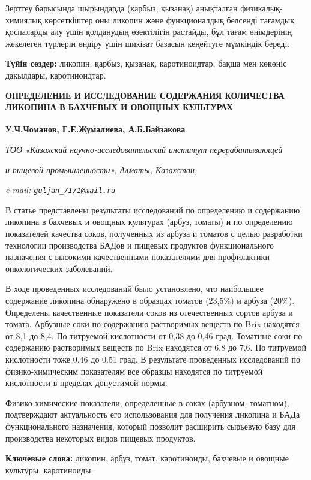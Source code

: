 Зерттеу барысында шырындарда (қарбыз, қызанақ) анықталған
физикалық-химиялық көрсеткіштер оны ликопин және функционалдық белсенді
тағамдық қоспаларды алу үшін қолданудың өзектілігін растайды, бұл тағам
өнімдерінің жекелеген түрлерін өндіру үшін шикізат базасын кеңейтуге
мүмкіндік береді.

{\bfseries Түйін сөздер:} ликопин, қарбыз, қызанақ, каротиноидтар, бақша
мен көкөніс дақылдары, каротиноидтар.

{\bfseries ОПРЕДЕЛЕНИЕ И ИССЛЕДОВАНИЕ СОДЕРЖАНИЯ КОЛИЧЕСТВА ЛИКОПИНА В
БАХЧЕВЫХ И ОВОЩНЫХ КУЛЬТУРАХ}

{\bfseries У.Ч.Чоманов, Г.Е.Жумалиева\textsuperscript{\envelope }, А.Б.Байзакова}

\emph{ТОО «Казахский научно-исследовательский институт перерабатывающей}

\emph{и пищевой промышленности», Алматы, Казахстан,}

\emph{e-mail:
\href{mailto:guljan_7171@mail.ru}{\nolinkurl{guljan\_7171@mail.ru}}}

В статье представлены результаты исследований по определению и
содержанию ликопина в бахчевых и овощных культурах (арбуз, томаты) и по
определению показателей качества соков, полученных из арбуза и томатов с
целью разработки технологии производства БАДов и пищевых продуктов
функционального назначения с высокими качественными показателями для
профилактики онкологических заболеваний.

В ходе проведенных исследований было установлено, что наибольшее
содержание ликопина обнаружено в образцах томатов (23,5\%) и арбуза
(20\%). Определены качественные показатели соков из отечественных сортов
арбуза и томата. Арбузные соки по содержанию растворимых веществ по Brix
находятся от 8,1 до 8,4. По титруемой кислотности от 0,38 до 0,46 град.
Томатные соки по содержанию растворимых веществ по Brix находятся от 6,8
до 7,6. По титруемой кислотности тоже 0,46 до 0.51 град. В результате
проведенных исследований по физико-химическим показателям все образцы
находятся по титруемой кислотности в пределах допустимой нормы.

Физико-химические показатели, определенные в соках (арбузном, томатном),
подтверждают актуальность его использования для получения ликопина и
БАДа функционального назначения, который позволит расширить сырьевую
базу для производства некоторых видов пищевых продуктов.

{\bfseries Ключевые слова:} ликопин, арбуз, томат, каротиноиды, бахчевые и
овощные культуры, каротиноиды.

